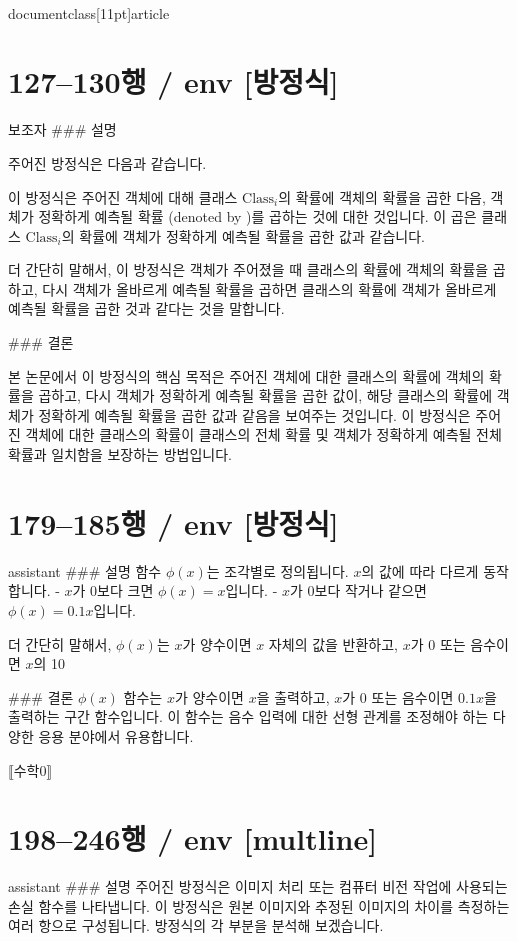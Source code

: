 \\documentclass[11pt]{article}
\begin{document}
\section*{127–130행 / env [방정식]}
보조자
### 설명

주어진 방정식은 다음과 같습니다.

이 방정식은 주어진 객체에 대해 클래스 \( \textrm{Class}_i \)의 확률에 객체의 확률을 곱한 다음, 객체가 정확하게 예측될 확률 (denoted by )를 곱하는 것에 대한 것입니다. 이 곱은 클래스 \( \textrm{Class}_i \)의 확률에 객체가 정확하게 예측될 확률을 곱한 값과 같습니다.

더 간단히 말해서, 이 방정식은 객체가 주어졌을 때 클래스의 확률에 객체의 확률을 곱하고, 다시 객체가 올바르게 예측될 확률을 곱하면 클래스의 확률에 객체가 올바르게 예측될 확률을 곱한 것과 같다는 것을 말합니다.

### 결론

본 논문에서 이 방정식의 핵심 목적은 주어진 객체에 대한 클래스의 확률에 객체의 확률을 곱하고, 다시 객체가 정확하게 예측될 확률을 곱한 값이, 해당 클래스의 확률에 객체가 정확하게 예측될 확률을 곱한 값과 같음을 보여주는 것입니다. 이 방정식은 주어진 객체에 대한 클래스의 확률이 클래스의 전체 확률 및 객체가 정확하게 예측될 전체 확률과 일치함을 보장하는 방법입니다.

\section*{179–185행 / env [방정식]}
assistant
### 설명
함수 \(\phi(x)\)는 조각별로 정의됩니다. \(x\)의 값에 따라 다르게 동작합니다.
- \(x\)가 0보다 크면 \(\phi(x) = x\)입니다.
- \(x\)가 0보다 작거나 같으면 \(\phi(x) = 0.1x\)입니다.

더 간단히 말해서, \(\phi(x)\)는 \(x\)가 양수이면 \(x\) 자체의 값을 반환하고, \(x\)가 0 또는 음수이면 \(x\)의 10%

### 결론
\(\phi(x)\) 함수는 \(x\)가 양수이면 \(x\)을 출력하고, \(x\)가 0 또는 음수이면 \(0.1x\)을 출력하는 구간 함수입니다. 이 함수는 음수 입력에 대한 선형 관계를 조정해야 하는 다양한 응용 분야에서 유용합니다.

⟦수학0⟧

\section*{198–246행 / env [multline]}
assistant
### 설명
주어진 방정식은 이미지 처리 또는 컴퓨터 비전 작업에 사용되는 손실 함수를 나타냅니다. 이 방정식은 원본 이미지와 추정된 이미지의 차이를 측정하는 여러 항으로 구성됩니다. 방정식의 각 부분을 분석해 보겠습니다.
\end{document}
